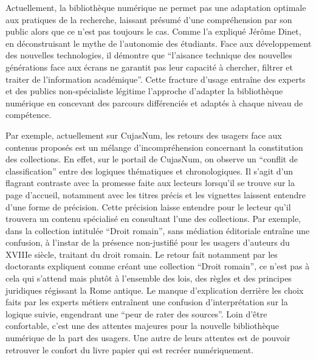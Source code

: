 Actuellement, la bibliothèque numérique ne permet pas une adaptation optimale aux pratiques de la recherche, laissant présumé d'une compréhension par son public alors que ce n'est pas toujours le cas. Comme l'a expliqué Jérôme Dinet, en déconstruisant le mythe de l'autonomie des étudiants. Face aux développement des nouvelles technologies, il démontre que \enquote{l'aisance technique des nouvelles générations face aux écrans ne garantit pas leur capacité à chercher, filtrer et traiter de l'information académique}. Cette fracture d'usage entraîne des experts et des publics non-spécialiste légitime l'approche d'adapter la bibliothèque numérique en concevant des parcours différenciés et adaptés à chaque niveau de compétence. 
 
Par exemple, actuellement sur CujasNum, les retours des usagers face aux contenus proposés est un mélange d'incompréhension concernant la constitution des collections. En effet, sur le portail de CujasNum, on observe un \enquote{conflit de classification} entre des logiques thématiques et chronologiques. Il s'agit d'un flagrant contraste avec la promesse faite aux lecteurs lorsqu'il se trouve sur la page d'accueil, notamment avec les titres précis et les vignettes laissent entendre d'une forme de précision. Cette précision laisse entendre pour le lecteur qu'il trouvera un contenu spécialisé en consultant l'une des collections. Par exemple, dans la collection intitulée \enquote{Droit romain}, sans médiation éditoriale entraîne une confusion, à l'instar de la présence non-justifié pour les usagers d'auteurs du XVIIIe siècle, traitant du droit romain. Le retour fait notamment par les doctorants expliquent comme créant une collection \enquote{Droit romain}, ce n'est pas à cela qui s'attend mais plutôt à l'ensemble des lois, des règles et des principes juridiques régissant la Rome antique. Le manque d'explication derrière les choix faits par les experts métiers entraînent une confusion d'interprétation sur la logique suivie, engendrant une \enquote{peur de rater des sources}. Loin d'être confortable, c'est une des attentes majeures pour la nouvelle bibliothèque numérique de la part des usagers. Une autre de leurs attentes est de pouvoir retrouver le confort du livre papier qui est recréer numériquement. 